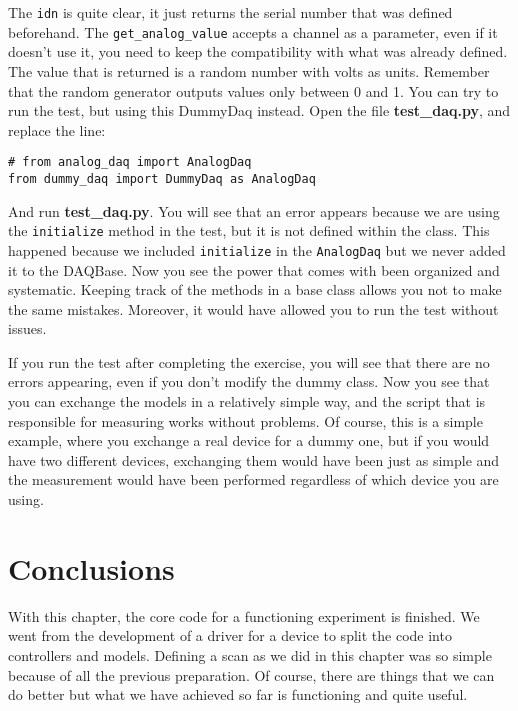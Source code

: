 {\begin{verbatim}
\end{verbatim}

The \texttt{idn} is quite clear, it just returns the serial number that was defined beforehand. The \texttt{get_analog_value} accepts a channel as a parameter, even if it doesn't use it, you need to keep the compatibility with what was already defined. The value that is returned is a random number with volts as units. Remember that the random generator outputs values only between 0 and 1. You can try to run the test, but using this DummyDaq instead. Open the file \textbf{test\_daq.py}, and replace the line:

\begin{verbatim}
# from analog_daq import AnalogDaq
from dummy_daq import DummyDaq as AnalogDaq
\end{verbatim}

And run \textbf{test\_daq.py}. You will see that an error appears because we are using the \texttt{initialize} method in the test, but it is not defined within the class. This happened because we included \texttt{initialize} in the \texttt{AnalogDaq} but we never added it to the DAQBase. Now you see the power that comes with been organized and systematic. Keeping track of the methods in a base class allows you not to make the same mistakes. Moreover, it would have allowed you to run the test without issues.


If you run the test after completing the exercise, you will see that there are no errors appearing, even if you don't modify the dummy class. Now you see that you can exchange the models in a relatively simple way, and the script that is responsible for measuring works without problems. Of course, this is a simple example, where you exchange a real device for a dummy one, but if you would have two different devices, exchanging them would have been just as simple and the measurement would have been performed regardless of which device you are using.


\section{Conclusions}\label{experiment-model-conclusions}
With this chapter, the core code for a functioning experiment is finished. We went from the development of a driver for a device to split the code into controllers and models. Defining a scan as we did in this chapter was so simple because of all the previous preparation. Of course, there are things that we can do better but what we have achieved so far is functioning and quite useful.

}
